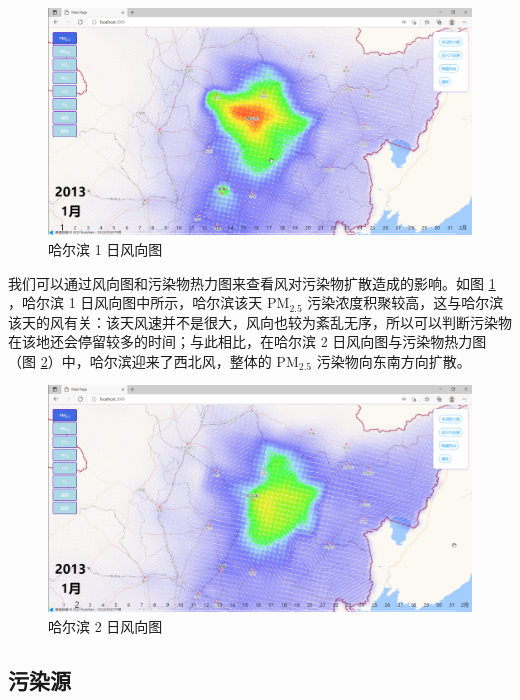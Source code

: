 \documentclass[UTF8]{ctexrep}
\begin{document}
	\begin{figure}[h!]
        \centering
        \includegraphics[width=15cm,keepaspectratio]{images/wind_map1.png}
        \caption{哈尔滨 1 日风向图}
        \label{fig:wind_map1}
    \end{figure}
    
    我们可以通过风向图和污染物热力图来查看风对污染物扩散造成的影响。如图 \ref{fig:wind_map1} ，哈尔滨 1 日风向图中所示，哈尔滨该天 $\mathrm{PM}_{2.5}$ 污染浓度积聚较高，这与哈尔滨该天的风有关：该天风速并不是很大，风向也较为紊乱无序，所以可以判断污染物在该地还会停留较多的时间；与此相比，在哈尔滨 2 日风向图与污染物热力图（图 \ref{fig:wind_map2}）中，哈尔滨迎来了西北风，整体的 $\mathrm{PM}_{2.5}$ 污染物向东南方向扩散。
    
    \begin{figure}[h!]
        \centering
        \includegraphics[width=15cm,keepaspectratio]{images/wind_map2.png}
        \caption{哈尔滨 2 日风向图}
        \label{fig:wind_map2}
    \end{figure}


    \subsection{污染源}
\end{document}

